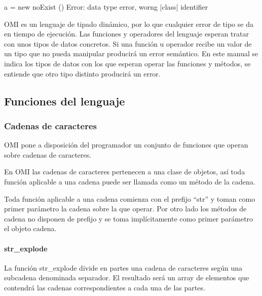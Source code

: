 \begin{myverbatim}
   a = new noExist ()
   Error: data type error, worng |class| identifier
\end{myverbatim}

OMI es un lenguaje de tipado dinámico, por lo que cualquier error de tipo se da en tiempo de ejecución. Las funciones y operadores
del lenguaje esperan tratar con unos tipos de datos concretos. Si una función u operador recibe un valor de un tipo 
que no pueda manipular producirá un error semántico. En este manual se indica los tipos de datos con los que esperan operar 
las funciones y métodos, se entiende que otro tipo distinto producirá un error. 

\subsection{Funciones del lenguaje}
\subsubsection{Cadenas de caracteres}
OMI pone a disposición del programador un conjunto de funciones que operan sobre cadenas de caracteres.

En OMI las cadenas de caracteres pertenecen a una clase de objetos, así toda función aplicable a una cadena
puede ser llamada como un método de la cadena. 

Toda función aplicable a una cadena comienza con el prefijo ``str'' y toman como primer parámetro la cadena sobre la que 
operar. Por otro lado los métodos de cadena no disponen de prefijo y se toma implícitamente como primer parámetro el objeto 
cadena. 



\paragraph {str\_explode}
La función str\_explode divide en partes una cadena de caracteres según una subcadena denominada separador. El resultado 
será un array de elementos que contendrá las cadenas correspondientes a cada una de las partes. 

